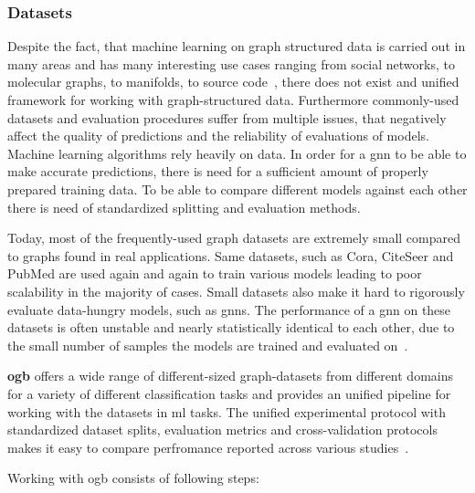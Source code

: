 \subsubsection{Datasets}
\label{sec:implement:setup:choice:data}
Despite the fact, that machine learning on graph structured data is carried out in many areas and has many interesting use cases ranging from social networks, to molecular graphs, to manifolds, to source code~\cite{Hu2020},
there does not exist and unified framework for working with graph-structured data. Furthermore commonly-used datasets and evaluation procedures suffer from multiple issues, that negatively affect the quality of predictions and the reliability of evaluations of models.
Machine learning algorithms rely heavily on data. In order for a \ac{gnn} to be able to make accurate predictions, there is need for a sufficient amount of properly prepared training data. To be able to compare different models against each other there is need of standardized splitting and evaluation methods.

Today, most of the frequently-used
graph datasets are extremely small compared to graphs found in
real applications. Same datasets, such as Cora, CiteSeer and PubMed are used again and again to train various models leading to poor scalability in the majority of cases. Small datasets also make it hard to rigorously evaluate data-hungry models, such as \acfp{gnn}. The performance of a \ac{gnn} on these datasets is often unstable and nearly statistically identical to each other, due to the small number of samples the models are trained and evaluated on~\cite{Kipf2017,Xu2019, Hu2020}.

\textbf{\Ac{ogb}} offers a wide range of different-sized graph-datasets from different domains for a variety of different classification tasks and provides an unified pipeline for working with the datasets in \ac{ml} tasks.
The unified experimental protocol with standardized dataset splits, evaluation metrics and cross-validation protocols makes it easy to compare perfromance reported across various studies~\cite{Hu2020}.

Working with \ac{ogb} consists of following steps:

